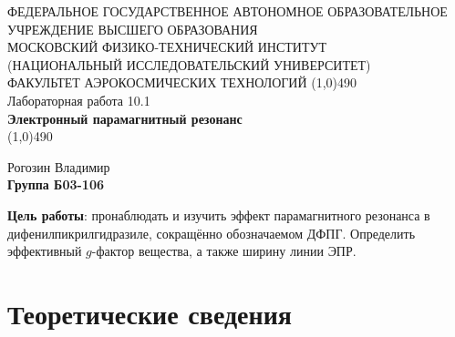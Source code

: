 \documentclass[a4paper,12pt]{article}
\begin{document}
\begin{titlepage}
\begin{center}
\large{\small ФЕДЕРАЛЬНОЕ ГОСУДАРСТВЕННОЕ АВТОНОМНОЕ ОБРАЗОВАТЕЛЬНОЕ\\ УЧРЕЖДЕНИЕ ВЫСШЕГО ОБРАЗОВАНИЯ \\ МОСКОВСКИЙ ФИЗИКО-ТЕХНИЧЕСКИЙ ИНСТИТУТ\\ (НАЦИОНАЛЬНЫЙ ИССЛЕДОВАТЕЛЬСКИЙ УНИВЕРСИТЕТ)\\ ФАКУЛЬТЕТ АЭРОКОСМИЧЕСКИХ ТЕХНОЛОГИЙ}
\vfill
\line(1,0){490}\\[1mm]
\huge{Лабораторная работа 10.1}\\
\huge\textbf{Электронный парамагнитный резонанс}\\
\line(1,0){490}\\[1mm]
\vfill
\begin{flushright}
\normalsize{Рогозин Владимир}\\
\normalsize{\textbf{Группа Б03-106}}\\
\end{flushright}
\end{center}
\end{titlepage}

\textbf{Цель работы}:
пронаблюдать и изучить эффект парамагнитного резонанса в дифенилпикрилгидразиле, сокращённо обозначаемом ДФПГ. Определить эффективный $g$-фактор вещества, а также ширину линии ЭПР.




\section{Теоретические сведения}
\end{document}
